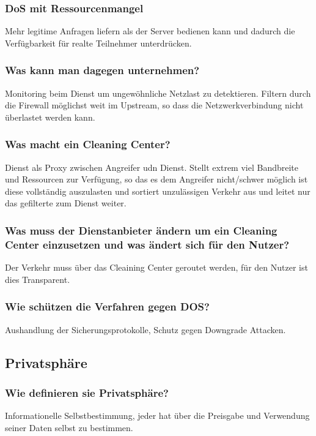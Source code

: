 	\subsubsection{DoS mit Ressourcenmangel}
	Mehr legitime Anfragen liefern als der Server bedienen kann und dadurch die Verfügbarkeit für realte Teilnehmer unterdrücken.
	
	\subsubsection{Was kann man dagegen unternehmen?}
	Monitoring beim Dienst um ungewöhnliche Netzlast zu detektieren. Filtern durch die Firewall möglichst weit im Upstream, so dass die Netzwerkverbindung nicht überlastet werden kann. 
	
	\subsubsection{Was macht ein Cleaning Center?}
	Dienst als Proxy zwischen Angreifer udn Dienst. Stellt extrem viel Bandbreite und Ressourcen zur Verfügung, so das es dem Angreifer nicht/schwer möglich ist diese vollständig auszulasten und sortiert unzulässigen Verkehr aus und leitet nur das gefilterte zum Dienst weiter.
	
	\subsubsection{Was muss der Dienstanbieter ändern um ein Cleaning Center einzusetzen und was ändert sich für den Nutzer?}
	Der Verkehr muss über das Cleaining Center geroutet werden, für den Nutzer ist dies Transparent.
	
	\subsubsection{Wie schützen die Verfahren gegen DOS?}
	Aushandlung der Sicherungsprotokolle, Schutz gegen Downgrade Attacken.
	
	\subsection{Privatsphäre}
	\subsubsection{Wie definieren sie Privatsphäre?}
	Informationelle Selbstbestimmung, jeder hat über die Preisgabe und Verwendung seiner Daten selbst zu bestimmen.
	
